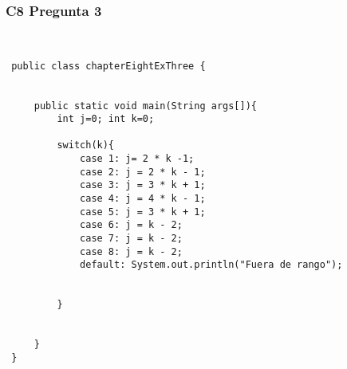 \subsubsection{C8 Pregunta 3}

\lstset{language=JAva} 
 \begin{lstlisting}

 
 public class chapterEightExThree {

     
     public static void main(String args[]){
         int j=0; int k=0;
         
         switch(k){
             case 1: j= 2 * k -1;
             case 2: j = 2 * k - 1;
             case 3: j = 3 * k + 1;
             case 4: j = 4 * k - 1;
             case 5: j = 3 * k + 1;
             case 6: j = k - 2;
             case 7: j = k - 2;
             case 8: j = k - 2;
             default: System.out.println("Fuera de rango");
                 
         
         }
         
     
     }
 }
 \end{lstlisting}